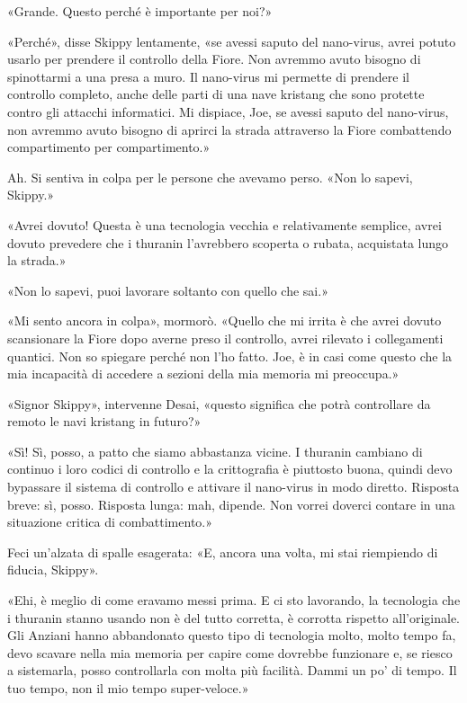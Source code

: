 «Grande. Questo perché è importante per noi?»

«Perché», disse Skippy lentamente, «se avessi saputo del nano-virus,
avrei potuto usarlo per prendere il controllo della Fiore. Non avremmo
avuto bisogno di spinottarmi a una presa a muro. Il nano-virus mi
permette di prendere il controllo completo, anche delle parti di una
nave kristang che sono protette contro gli attacchi informatici. Mi
dispiace, Joe, se avessi saputo del nano-virus, non avremmo avuto
bisogno di aprirci la strada attraverso la Fiore combattendo
compartimento per compartimento.»

Ah. Si sentiva in colpa per le persone che avevamo perso. «Non lo
sapevi, Skippy.»

«Avrei dovuto! Questa è una tecnologia vecchia e relativamente semplice,
avrei dovuto prevedere che i thuranin l'avrebbero scoperta o rubata,
acquistata lungo la strada.»

«Non lo sapevi, puoi lavorare soltanto con quello che sai.»

«Mi sento ancora in colpa», mormorò. «Quello che mi irrita è che avrei
dovuto scansionare la Fiore dopo averne preso il controllo, avrei
rilevato i collegamenti quantici. Non so spiegare perché non l'ho fatto.
Joe, è in casi come questo che la mia incapacità di accedere a sezioni
della mia memoria mi preoccupa.»

«Signor Skippy», intervenne Desai, «questo significa che potrà
controllare da remoto le navi kristang in futuro?»

«Sì! Sì, posso, a patto che siamo abbastanza vicine. I thuranin cambiano
di continuo i loro codici di controllo e la crittografia è piuttosto
buona, quindi devo bypassare il sistema di controllo e attivare il
nano-virus in modo diretto. Risposta breve: sì, posso. Risposta lunga:
mah, dipende. Non vorrei doverci contare in una situazione critica di
combattimento.»

Feci un'alzata di spalle esagerata: «E, ancora una volta, mi stai
riempiendo di fiducia, Skippy».

«Ehi, è meglio di come eravamo messi prima. E ci sto lavorando, la
tecnologia che i thuranin stanno usando non è del tutto corretta, è
corrotta rispetto all'originale. Gli Anziani hanno abbandonato questo
tipo di tecnologia molto, molto tempo fa, devo scavare nella mia memoria
per capire come dovrebbe funzionare e, se riesco a sistemarla, posso
controllarla con molta più facilità. Dammi un po' di tempo. Il tuo
tempo, non il mio tempo super-veloce.»

